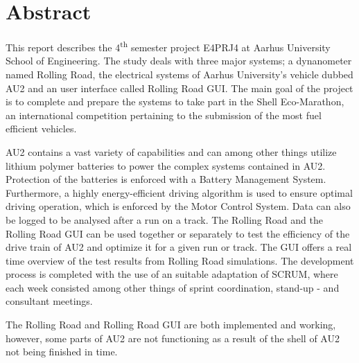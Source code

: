 \chapter{Abstract}
This report describes the 4\textsuperscript{th} semester project E4PRJ4 at Aarhus University School of Engineering. The study deals with three major systems; a dynanometer named Rolling Road, the electrical systems of Aarhus University's vehicle dubbed AU2 and an user interface called Rolling Road GUI. The main goal of the project is to complete and prepare the systems to take part in the Shell Eco-Marathon, an international competition pertaining to the submission of the most fuel efficient vehicles. 

AU2 contains a vast variety of capabilities and can among other things utilize lithium polymer batteries to power the complex systems contained in AU2.
Protection of the batteries is enforced with a Battery Management System. Furthermore, a highly energy-efficient driving algorithm is used to ensure optimal driving operation, which is enforced by the Motor Control System. Data can also be logged to be analysed after a run on a track.
The Rolling Road and the Rolling Road GUI can be used together or separately to test the efficiency of the drive train of AU2 and optimize it for a given run or track. The GUI offers a real time overview of the test results from Rolling Road simulations.
The development process is completed with the use of an suitable adaptation of SCRUM, where each week consisted among other things of sprint coordination, stand-up - and consultant meetings.

The Rolling Road and Rolling Road GUI are both implemented and working, however, some parts of AU2 are not functioning as a result of the shell of AU2 not being finished in time.